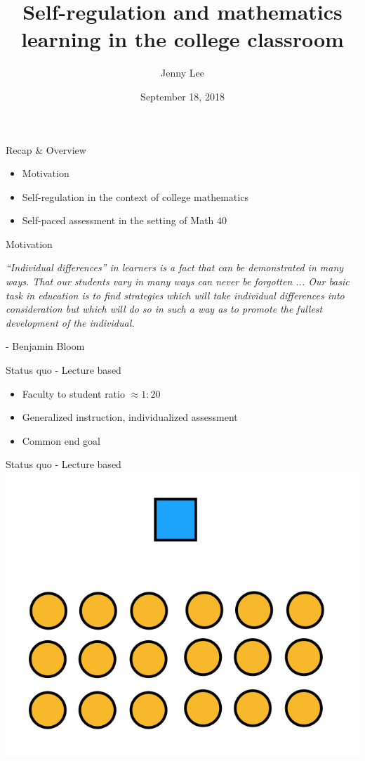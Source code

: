 \documentclass{beamer}
\title{Self-regulation and mathematics learning in the college classroom}
\date{September 18, 2018}
\author{Jenny Lee}
\institute{Harvey Mudd College\\Advisor: Dagan Karp}
\begin{document}
\maketitle
\begin{frame}{Recap \& Overview}
  \begin{itemize}
    \item Motivation
    \item Self-regulation in the context of college mathematics
    \item Self-paced assessment in the setting of Math 40
  \end{itemize}
\end{frame}
\begin{frame}{Motivation}
  \begin{center}
    \textit{``Individual differences'' in learners is a fact that can be demonstrated in many ways. That our students { {\color{blue}}{vary in many ways}} can never be forgotten ... Our basic task in education is to find strategies which will take individual differences into consideration but which will do so in such a way as to { {\color{blue}} promote the fullest development of the individual}.}
  \end{center}
  \hfill- Benjamin Bloom
\end{frame}
\begin{frame}{Status quo - Lecture based}
  \begin{itemize}
    \item Faculty to student ratio $\approx 1:20$
    \item Generalized instruction, individualized assessment
    \item Common end goal
  \end{itemize}
\end{frame}
\begin{frame}{Status quo - Lecture based}
  \centering
    \includegraphics[scale=0.5]{lecturestyle1}
\end{frame}
\end{document}
